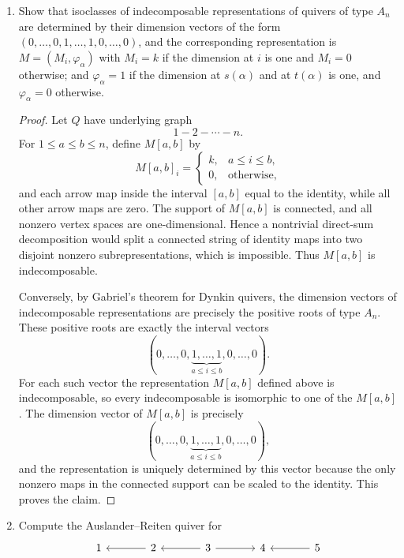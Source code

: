 \documentclass[11pt, a4paper]{article}
\begin{document}
\begin{enumerate}[leftmargin=*, label=\textbf{\arabic*.}]
\item Show that isoclasses of indecomposable representations of quivers of type $A_n$ are determined by their dimension vectors of the form $(0,\ldots,0,1,\ldots,1,0,\ldots,0)$, and the corresponding representation is $M=(M_i,\varphi_\alpha)$ with $M_i=k$ if the dimension at $i$ is one and $M_i=0$ otherwise; and $\varphi_\alpha=1$ if the dimension at $s(\alpha)$ and at $t(\alpha)$ is one, and $\varphi_\alpha=0$ otherwise.

\begin{proof}
Let $Q$ have underlying graph
\[
1-2-\cdots-n.
\]
For $1\le a\le b\le n$, define $M[a,b]$ by
\[
M[a,b]_i=\begin{cases}k,&a\le i\le b,\\0,&\text{otherwise,}\end{cases}
\]
and each arrow map inside the interval $[a,b]$ equal to the identity, while all other arrow maps are zero.
The support of $M[a,b]$ is connected, and all nonzero vertex spaces are one-dimensional. Hence a nontrivial direct-sum decomposition would split a connected string of identity maps into two disjoint nonzero subrepresentations, which is impossible. Thus $M[a,b]$ is indecomposable.

Conversely, by Gabriel's theorem for Dynkin quivers, the dimension vectors of
indecomposable representations are precisely the positive roots of type $A_n$.
These positive roots are exactly the interval vectors
\[
(0,\ldots,0,\underbrace{1,\ldots,1}_{a\le i\le b},0,\ldots,0).
\]
For each such vector the representation $M[a,b]$ defined above is
indecomposable, so every indecomposable is isomorphic to one of the $M[a,b]$.
The dimension vector of $M[a,b]$ is precisely
\[
(0,\ldots,0,\underbrace{1,\ldots,1}_{a\le i\le b},0,\ldots,0),
\]
and the representation is uniquely determined by this vector because the only nonzero maps in the connected support can be scaled to the identity. This proves the claim.
\end{proof}

\item Compute the Auslander--Reiten quiver for
\[
\begin{tikzcd}[column sep=large]
1 & 2 \arrow[l] & 3 \arrow[l] \arrow[r] & 4 & 5 \arrow[l]
\end{tikzcd}
\]


\end{enumerate}
\end{document}

